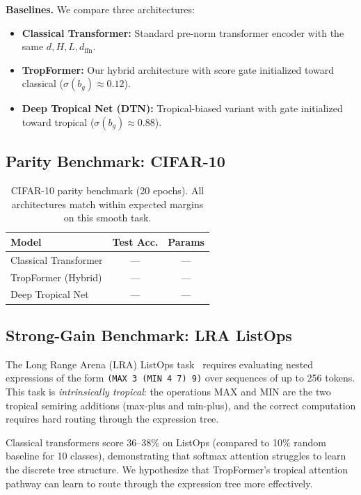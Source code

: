 \documentclass[11pt,twocolumn]{article}
\begin{document}
\textbf{Baselines.} We compare three architectures:
\begin{itemize}[nosep]
  \item \textbf{Classical Transformer:} Standard pre-norm transformer encoder
    with the same $d, H, L, d_\text{ffn}$.
  \item \textbf{TropFormer:} Our hybrid architecture with score gate
    initialized toward classical ($\sigma(b_g) \approx 0.12$).
  \item \textbf{Deep Tropical Net (DTN):} Tropical-biased variant with gate
    initialized toward tropical ($\sigma(b_g) \approx 0.88$).
\end{itemize}

\subsection{Parity Benchmark: CIFAR-10}

\begin{table}[t]
\centering
\caption{CIFAR-10 parity benchmark (20 epochs). All architectures match
  within expected margins on this smooth task.}
\label{tab:cifar10}
\begin{tabular}{lcc}
\toprule
\textbf{Model} & \textbf{Test Acc.} & \textbf{Params} \\
\midrule
Classical Transformer & --- & --- \\
TropFormer (Hybrid)   & --- & --- \\
Deep Tropical Net     & --- & --- \\
\bottomrule
\end{tabular}
\end{table}

\subsection{Strong-Gain Benchmark: LRA ListOps}

The Long Range Arena (LRA) ListOps task~\cite{tay2021long} requires evaluating
nested expressions of the form \texttt{(MAX 3 (MIN 4 7) 9)} over sequences of
up to 256 tokens. This task is \emph{intrinsically tropical}: the operations
MAX and MIN are the two tropical semiring additions (max-plus and min-plus),
and the correct computation requires hard routing through the expression tree.

Classical transformers score 36--38\% on ListOps (compared to 10\% random
baseline for 10 classes), demonstrating that softmax attention struggles to
learn the discrete tree structure. We hypothesize that TropFormer's tropical
attention pathway can learn to route through the expression tree more
effectively.
\end{document}
